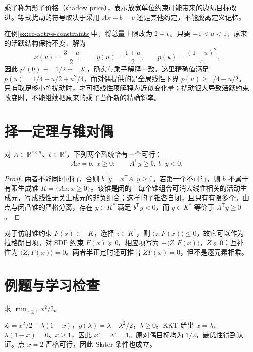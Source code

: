 \documentclass[UTF8,12pt,a4paper,fontset=fandol]{ctexbook}
\begin{document}
乘子称为影子价格（shadow price），表示放宽单位约束可能带来的边际目标改进。等式扰动的符号取决于采用 $Ax=b+v$ 还是其他约定，不能脱离定义记忆。

在例\ref{ex:co-active-constraints}中，将总量上限改为 $2+u$。只要 $-1<u<1$，原来的活跃结构保持不变，解为
\[
 x(u)=\frac{3+u}{2},\qquad y(u)=\frac{1+u}{2},\qquad
 p(u)=\frac{(1-u)^2}{4}.
\]
因此 $p'(0)=-1/2=-\lambda^\star$，确实与乘子解释一致。这里精确值满足 $p(u)=1/4-u/2+u^2/4$，而对偶提供的是全局线性下界 $p(u)\geq1/4-u/2$。只有取足够小的扰动时，才可把线性项解释为近似变化量；扰动很大导致活跃约束改变时，不能继续把原来的乘子当作新的精确斜率。

\section{择一定理与锥对偶}

\begin{theorem}[Farkas 引理]
对 $A\in\mathbb R^{r\times n}$、$b\in\mathbb R^r$，下列两个系统恰有一个可行：
\[
 Ax=b,\ x\geq0;\qquad A^{\mathsf T}y\geq0,\ b^{\mathsf T}y<0.
\]
\end{theorem}
\begin{proof}
两者不能同时可行，否则 $b^{\mathsf T}y=x^{\mathsf T}A^{\mathsf T}y\geq0$。若第一个不可行，则 $b$ 不属于有限生成锥 $K=\{Ax:x\geq0\}$。该锥是闭的：每个锥组合可消去线性相关的活动生成元，写成线性无关生成元的非负组合；这样的子锥各自闭，且只有有限多个。由点与闭凸锥的严格分离，存在 $y\in K^*$ 满足 $b^{\mathsf T}y<0$，而 $y\in K^*$ 等价于 $A^{\mathsf T}y\geq0$。
\end{proof}

对于仿射锥约束 $F(x)\in-K$，选择 $z\in K^*$，则 $\langle z,F(x)\rangle\leq0$，故它可以作为拉格朗日项。对 SDP 约束 $F(x)\succeq0$，相应项写为 $-\langle Z,F(x)\rangle$，$Z\succeq0$；互补性为 $\langle Z,F(x)\rangle=0$。两者半正定时还可推出 $ZF(x)=0$，但不是逐元素相乘。

\section{例题与学习检查}
\begin{example}
求 $\min_{x\geq1}x^2/2$。
\end{example}
\begin{solve}
$\mathcal L=x^2/2+\lambda(1-x)$，$g(\lambda)=\lambda-\lambda^2/2$，$\lambda\geq0$。KKT 给出 $x=\lambda$、$\lambda(1-x)=0$、$x\geq1$，因此 $x^\star=\lambda^\star=1$。原对偶目标均为 $1/2$，最优性得到认证。点 $x=2$ 严格可行，因此 Slater 条件也成立。
\end{solve}
\end{document}
